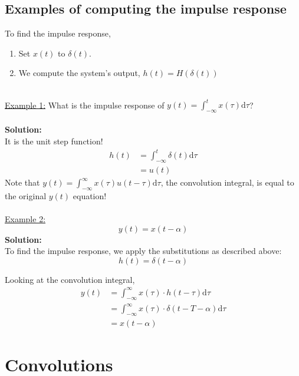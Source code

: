 \documentclass[10pt]{article}
\newcommand{\solution}{\textbf{Solution:}}
\begin{document}
\subsection*{Examples of computing the impulse response}
To find the impulse response,
\begin{enumerate}
    \item Set $x(t)$ to $\delta(t)$.
    \item We compute the system's output, $h(t) = H(\delta(t))$
\end{enumerate}
~\\
\underline{Example 1:}
What is the impulse response of $y(t) = \int_{-\infty}^t x(\tau) \text{d}\tau$?\\\\
\solution\\
It is the unit step function!
\begin{align*}
    h(t) &= \int_{-\infty}^t \delta(t) \text{d}\tau\\
    &= u(t)
\end{align*}
Note that $y(t) = \int_{-\infty}^\infty x(\tau) u(t - \tau) \text{d}\tau$, the convolution integral, is equal to the original $y(t)$ equation!\\\\
\underline{Example 2:}
\[y(t) = x(t - \alpha)\]
\solution\\
To find the impulse response, we apply the substitutions as described above:
\[h(t) = \delta(t - \alpha)\]

Looking at the convolution integral,
\begin{align*}
    y(t) &= \int_{-\infty}^\infty x(\tau) \cdot h(t - \tau) \text{d}\tau\\
    &= \int_{-\infty}^\infty x(\tau) \cdot \delta(t - T - \alpha) \text{d}\tau\\
    &= x(t - \alpha)
\end{align*}

\section*{Convolutions}
\end{document}
